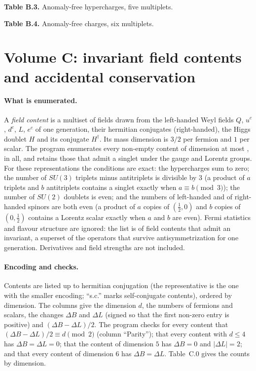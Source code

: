 \begin{center}\textbf{Table B.3.} Anomaly-free hypercharges, five multiplets.\end{center}


\begin{center}\textbf{Table B.4.} Anomaly-free charges, six multiplets.\end{center}


\section{Volume C: invariant field contents and accidental conservation}\label{app:c}

\paragraph{What is enumerated.} A \emph{field content} is a multiset of fields drawn from the left-handed Weyl fields $Q$, $u^c$, $d^c$, $L$, $e^c$ of one generation, their hermitian conjugates (right-handed), the Higgs doublet $H$ and its conjugate $H^\dagger$. Its mass dimension is $3/2$ per fermion and $1$ per scalar. The program enumerates every non-empty content of dimension at most \vvDmaxC{}, \vvNCtested{} in all, and retains those that admit a singlet under the gauge and Lorentz groups. For these representations the conditions are exact: the hypercharges sum to zero; the number of $SU(3)$ triplets minus antitriplets is divisible by $3$ (a product of $a$ triplets and $b$ antitriplets contains a singlet exactly when $a \equiv b \pmod 3$); the number of $SU(2)$ doublets is even; and the numbers of left-handed and of right-handed spinors are both even (a product of $a$ copies of $(\frac12,0)$ and $b$ copies of $(0,\frac12)$ contains a Lorentz scalar exactly when $a$ and $b$ are even). Fermi statistics and flavour structure are ignored: the list is of field contents that admit an invariant, a superset of the operators that survive antisymmetrization for one generation. Derivatives and field strengths are not included.

\paragraph{Encoding and checks.} Contents are listed up to hermitian conjugation (the representative is the one with the smaller encoding; \enquote{s.c.} marks self-conjugate contents), ordered by dimension. The columns give the dimension $d$, the numbers of fermions and scalars, the changes $\Delta B$ and $\Delta L$ (signed so that the first non-zero entry is positive) and $(\Delta B - \Delta L)/2$. The program checks for every content that $(\Delta B - \Delta L)/2 \equiv d \pmod 2$ (column \enquote{Parity}); that every content with $d \leq 4$ has $\Delta B = \Delta L = 0$; that the content of dimension $5$ has $\Delta B = 0$ and $|\Delta L| = 2$; and that every content of dimension $6$ has $\Delta B = \Delta L$. Table~C.0 gives the counts by dimension.

